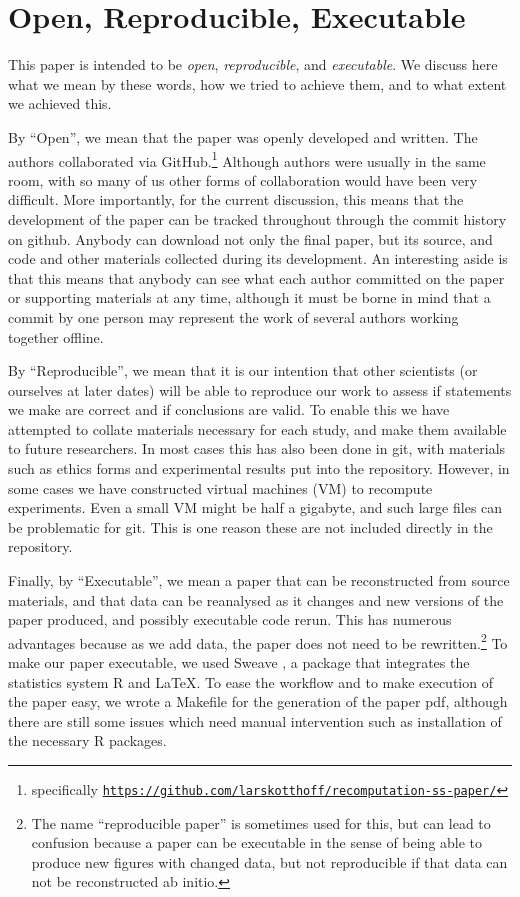 \section{Open, Reproducible, Executable}

This paper is intended to be \emph{open}, 
\emph{reproducible}, and \emph{executable}.  We discuss here what we mean by these words, how we tried to achieve them, and to what extent we achieved this.

By ``Open'', we mean that the paper was openly developed and written.  The authors collaborated via GitHub.\footnote{specifically
\texttt{\url{https://github.com/larskotthoff/recomputation-ss-paper/}}}   Although authors were usually in the same room, with so many of us other forms of collaboration would have been very 
difficult.  More importantly, for the current discussion, this means that the development of the paper can be tracked throughout through the commit history on github.  Anybody can download not only the final paper, but its source, and code and other materials collected during its development.  An interesting aside is that this means that anybody can see what each author committed on the paper or supporting materials at any time, although it must be borne in mind that a commit by one person may represent the work of several authors working together offline.

By ``Reproducible'', we mean that it is our intention that other scientists (or ourselves at later dates) will be able to reproduce our work to assess if statements we make are correct and if conclusions are valid.  To enable this we have attempted to collate materials necessary for each study, and make them available to future researchers.  In most cases this has also been done in git, 
with materials such as ethics forms and experimental results put into the repository.  However, in some cases we have constructed virtual machines (VM) to recompute experiments.  Even a small VM 
might be half a gigabyte, and such large files can be problematic for git.  This is one reason these are not included directly in the repository.

Finally, by ``Executable'', we mean a paper that can be reconstructed from source 
materials, and that data can be reanalysed as it changes and new versions of the paper produced, and possibly executable code rerun.  
This has numerous advantages because as we add data, the paper does not need to be rewritten.\footnote{The name ``reproducible paper'' is sometimes used for this, but can lead to confusion because a paper can be executable in the sense of being able to produce new figures with 
changed data, but not reproducible if that data can not be reconstructed ab initio.}
To make our paper executable, we used Sweave \cite{lmucs-papers:Leisch:2002}, a package that integrates the statistics system R and \LaTeX. 
To ease the workflow and to make execution of the paper easy, we wrote a Makefile for the generation of the paper pdf, although there are still some issues which need manual intervention such as installation of the necessary R packages. 

